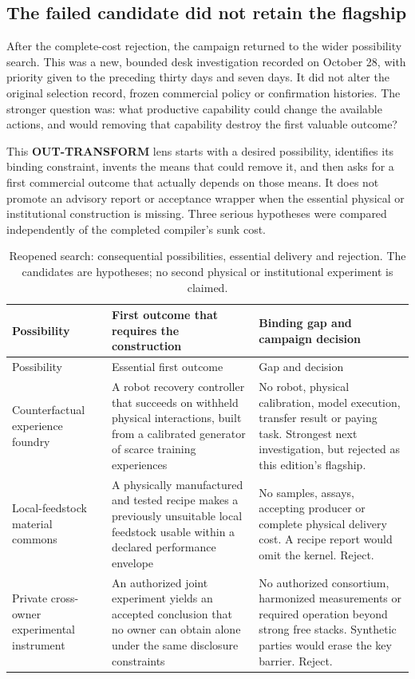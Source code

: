 \subsection{The failed candidate did not retain the flagship}
After the complete-cost rejection, the campaign returned to the wider possibility search. This was a new, bounded desk investigation recorded on October 28, with priority given to the preceding thirty days and seven days. It did not alter the original selection record, frozen commercial policy or confirmation histories. The stronger question was: what productive capability could change the available actions, and would removing that capability destroy the first valuable outcome?

This \textbf{OUT-TRANSFORM} lens starts with a desired possibility, identifies its binding constraint, invents the means that could remove it, and then asks for a first commercial outcome that actually depends on those means. It does not promote an advisory report or acceptance wrapper when the essential physical or institutional construction is missing. Three serious hypotheses were compared independently of the completed compiler's sunk cost.

\begin{longtable}{L{.21\textwidth}L{.34\textwidth}L{.36\textwidth}}
\caption{Reopened search: consequential possibilities, essential delivery and rejection. The candidates are hypotheses; no second physical or institutional experiment is claimed.}\\
\toprule Possibility & First outcome that requires the construction & Binding gap and campaign decision\\
\midrule\endfirsthead
\toprule Possibility & Essential first outcome & Gap and decision\\\midrule\endhead
Counterfactual experience foundry & A robot recovery controller that succeeds on withheld physical interactions, built from a calibrated generator of scarce training experiences & No robot, physical calibration, model execution, transfer result or paying task. Strongest next investigation, but rejected as this edition's flagship.\\
Local-feedstock material commons & A physically manufactured and tested recipe makes a previously unsuitable local feedstock usable within a declared performance envelope & No samples, assays, accepting producer or complete physical delivery cost. A recipe report would omit the kernel. Reject.\\
Private cross-owner experimental instrument & An authorized joint experiment yields an accepted conclusion that no owner can obtain alone under the same disclosure constraints & No authorized consortium, harmonized measurements or required operation beyond strong free stacks. Synthetic parties would erase the key barrier. Reject.\\
\bottomrule
\end{longtable}

